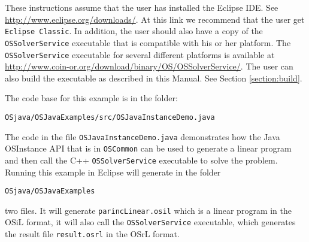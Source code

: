 These instructions assume that the user has installed the Eclipse IDE. See
\url{http://www.eclipse.org/downloads/}. At this link we recommend that the 
user get {\tt Eclipse Classic}.  In addition, the user should also have a copy of the
{\tt OSSolverService} executable that is compatible with his or her platform.
The {\tt OSSolverService} executable for several different platforms is
available at \url{http://www.coin-or.org/download/binary/OS/OSSolverService/}. 
The user can also build the executable as described in this Manual.  See Section
\ref{section:build}. 

The code base for this example is in the folder:
\begin{verbatim}
OSjava/OSJavaExamples/src/OSJavaInstanceDemo.java
\end{verbatim}
The code in the file {\tt OSJavaInstanceDemo.java} demonstrates how the
Java OSInstance API that is in {\tt OSCommon} can be used to generate a linear
program and then call the C++ {\tt OSSolverService} executable 
to solve the problem.  Running this example in Eclipse will
generate in the folder
\begin{verbatim}
OSjava/OSJavaExamples
\end{verbatim}
two files. It will generate {\tt parincLinear.osil} which is a linear program in
the OSiL format, it will also call the {\tt OSSolverService} executable, which
generates the result file {\tt result.osrl} in the OSrL format. 


